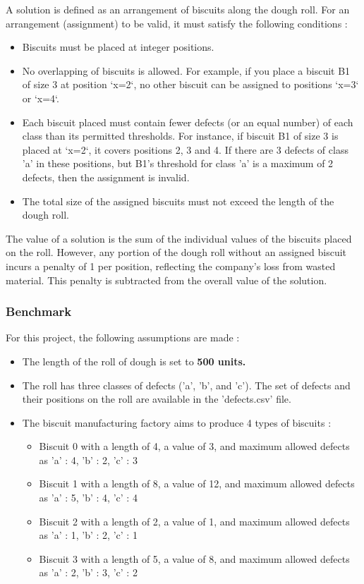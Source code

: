 \documentclass{modeleRapport}
\begin{document}
A solution is defined as an arrangement of biscuits along the dough roll. For an arrangement (assignment) to be valid, 
it must satisfy the following conditions :

\begin{itemize}
    \item Biscuits must be placed at integer positions.
    \item No overlapping of biscuits is allowed. For example, if you place a biscuit B1 of size 3 at position ‘x=2‘, no other 
    biscuit can be assigned to positions ‘x=3‘ or ‘x=4‘.
    \item Each biscuit placed must contain fewer defects (or an equal number) of each class than its permitted thresholds. 
    For instance, if biscuit B1 of size 3 is placed at ‘x=2‘, it covers positions 2, 3 and 4. If there are 3 defects of 
    class ’a’ in these positions, but B1’s threshold for class ’a’ is a maximum of 2 defects, then the assignment is invalid.
    \item The total size of the assigned biscuits must not exceed the length of the dough roll.
\end{itemize}

The value of a solution is the sum of the individual values of the biscuits placed on the roll. However, any portion of 
the dough roll without an assigned biscuit incurs a penalty of 1 per position, reflecting the company’s loss from wasted 
material. This penalty is subtracted from the overall value of the solution.

\newpage

\subsubsection{Benchmark}

For this project, the following assumptions are made :

\begin{itemize}
    \item The length of the roll of dough is set to \textbf{500 units.}
    \item The roll has three classes of defects (’a’, ’b’, and ’c’). The set of defects and their positions on the roll 
    are available in the ’defects.csv’ file.
    \item The biscuit manufacturing factory aims to produce 4 types of biscuits :
    \begin{itemize}
        \item Biscuit 0 with a length of 4, a value of 3, and maximum allowed defects as {'a' : 4, 'b' : 2, 'c' : 3}
        \item Biscuit 1 with a length of 8, a value of 12, and maximum allowed defects as {'a' : 5, 'b' : 4, 'c' : 4}
        \item Biscuit 2 with a length of 2, a value of 1, and maximum allowed defects as {'a' : 1, 'b' : 2, 'c' : 1}
        \item Biscuit 3 with a length of 5, a value of 8, and maximum allowed defects as {'a' : 2, 'b' : 3, 'c' : 2}
    \end{itemize}
\end{itemize}
\end{document}
